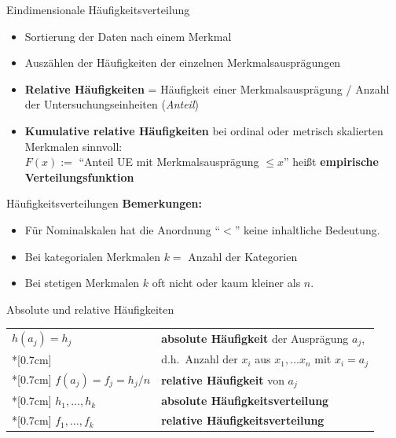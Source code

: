 \documentclass[
  10pt,
  ignorenonframetext,
]{beamer}
\providecommand{\tightlist}{%
  \setlength{\itemsep}{0pt}\setlength{\parskip}{0pt}}
\begin{document}
\begin{frame}{Eindimensionale Häufigkeitsverteilung}
\label{eindimensionale-huxe4ufigkeitsverteilung}
\begin{itemize}
\tightlist
\item
  Sortierung der Daten nach einem Merkmal
\item
  Auszählen der Häufigkeiten der einzelnen Merkmalsausprägungen
\item
  \textbf{Relative Häufigkeiten} = Häufigkeit einer Merkmalsausprägung /
  Anzahl der Untersuchungseinheiten (\emph{Anteil})
\item
  \textbf{Kumulative relative Häufigkeiten} bei ordinal oder metrisch
  skalierten Merkmalen sinnvoll:\\
  \(F(x):=\) ``Anteil UE mit Merkmalsausprägung \(\leq x\)'' heißt
  \textbf{empirische Verteilungsfunktion}
\end{itemize}
\end{frame}

\begin{frame}{Häufigkeitsverteilungen}
\label{huxe4ufigkeitsverteilungen}
\textbf{Bemerkungen:}

\begin{itemize}
\tightlist
\item
  Für Nominalskalen hat die Anordnung ``\(<\)'' keine inhaltliche
  Bedeutung.
\item
  Bei kategorialen Merkmalen \(k =\) Anzahl der Kategorien\\
\item
  Bei stetigen Merkmalen \(k\) oft nicht oder kaum kleiner als \(n\).
\end{itemize}
\end{frame}

\begin{frame}{Absolute und relative Häufigkeiten}
\label{absolute-und-relative-huxe4ufigkeiten}
\begin{tabular}{ll}
$h(a_j) = h_j$ & \textbf{absolute Häufigkeit} der
Ausprägung $a_j$,\\*[0.7cm]
           &  d.h.~Anzahl der $x_i$ aus $x_1,\dots x_n$ mit $x_i = a_j$
\\*[0.7cm]
$ f(a_j) = f_j = h_j/n$ & \textbf{relative Häufigkeit}
von $a_j$ \\*[0.7cm]
$h_1 , \ldots , h_k$    & \textbf{absolute
Häufigkeitsverteilung} \\*[0.7cm]
$f_1 , \ldots , f_k $   & \textbf{relative
Häufigkeitsverteilung}
\end{tabular}
\end{frame}
\end{document}
